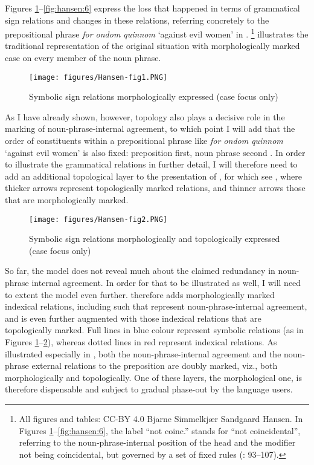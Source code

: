 \documentclass[output=paper]{langsci/langscibook}
\begin{document}
Figures \ref{fig:hansen:1}--\ref{fig:hansen:6} express the loss that happened in terms of grammatical sign relations and changes in these relations, referring concretely to the prepositional phrase \textit{for ondom quinnom} ‘against evil women’ in . \footnote{All figures and tables: CC-BY 4.0 Bjarne Simmelkjær Sandgaard Hansen. In Figures \ref{fig:hansen:1}--\ref{fig:hansen:6}, the label “not coinc.” stands for “not coincidental”, referring to the noun-phrase-internal position of the head and the modifier not being coincidental, but governed by a set of fixed rules (\citealt{Diderichsen1941}: 93–107).} illustrates the traditional representation of the original situation with morphologically marked case on every member of the noun phrase.


\begin{figure}
	\caption{Symbolic sign relations morphologically expressed (case focus only)\label{fig:hansen:1}}
	\texttt{[image: figures/Hansen-fig1.PNG]}
\end{figure}


As I have already shown, however, topology also plays a decisive role in the marking of noun-phrase-internal agreement, to which point I will add that the order of constituents within a prepositional phrase like \textit{for ondom quinnom} ‘against evil women’ is also fixed: preposition first, noun phrase second \citep[109]{Diderichsen1941}. In order to illustrate the grammatical relations in further detail, I will therefore need to add an additional topological layer to the presentation of , for which see , where thicker arrows represent topologically marked relations, and thinner arrows those that are morphologically marked.


\begin{figure}
	\caption{Symbolic sign relations morphologically and topologically expressed (case focus only)\label{fig:hansen:2}}
	\texttt{[image: figures/Hansen-fig2.PNG]}
\end{figure}


So far, the model does not reveal much about the claimed redundancy in noun-phrase internal agreement. In order for that to be illustrated as well, I will need to extent the model even further.  therefore adds morphologically marked indexical relations, including such that represent noun-phrase-internal agreement, and  is even further augmented with those indexical relations that are topologically marked. Full lines in blue colour represent symbolic relations (as in Figures \ref{fig:hansen:1}--\ref{fig:hansen:2}), whereas dotted lines in red represent indexical relations. As illustrated especially in , both the noun-phrase-internal agreement and the noun-phrase external relations to the preposition are doubly marked, viz., both morphologically and topologically. One of these layers, the morphological one, is therefore dispensable and subject to gradual phase-out by the language users.
\end{document}
